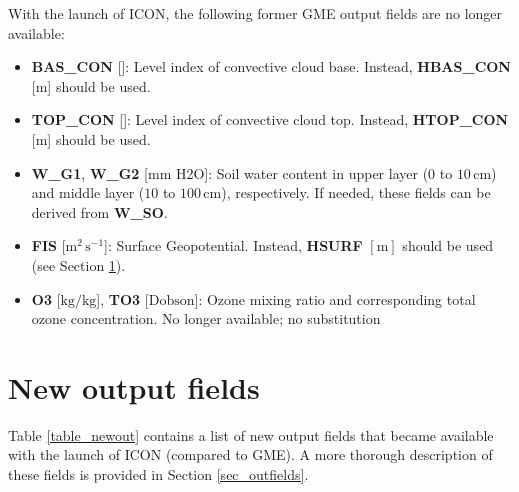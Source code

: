 With the launch of ICON, the following former GME output fields are no longer available:

\begin{itemize}
 \item \textbf{BAS\_CON} [\textendash]: Level index of convective cloud base. Instead, \textbf{HBAS\_CON} [m] should be used.
 \item \textbf{TOP\_CON} [\textendash]: Level index of convective cloud top. Instead, \textbf{HTOP\_CON} [m] should be used.
 \item \textbf{W\_G1}, \textbf{W\_G2}  [mm H2O]: Soil water content in upper layer ($0$ to $10\,\mathrm{cm}$) and middle layer ($10$ to $100\,\mathrm{cm}$), respectively. 
                                                 If needed, these fields can be derived from \textbf{W\_SO}.
 \item \textbf{FIS} [$\mathrm{m^{2}\,s^{-1}}$]: Surface Geopotential. Instead, \textbf{HSURF} $[\mathrm{m}]$ should be used (see Section \ref{sec_newout}).
 \item \textbf{O3} [$\mathrm{kg/kg}$], \textbf{TO3} [$\mathrm{Dobson}$]: Ozone mixing ratio and corresponding total ozone concentration. No longer available; no substitution
\end{itemize}


\section{New output fields}\label{sec_newout}

Table \ref{table_newout} contains a list of new output fields that became available with the launch of ICON (compared to GME). A more thorough description of these 
fields is provided in Section \ref{sec_outfields}.

